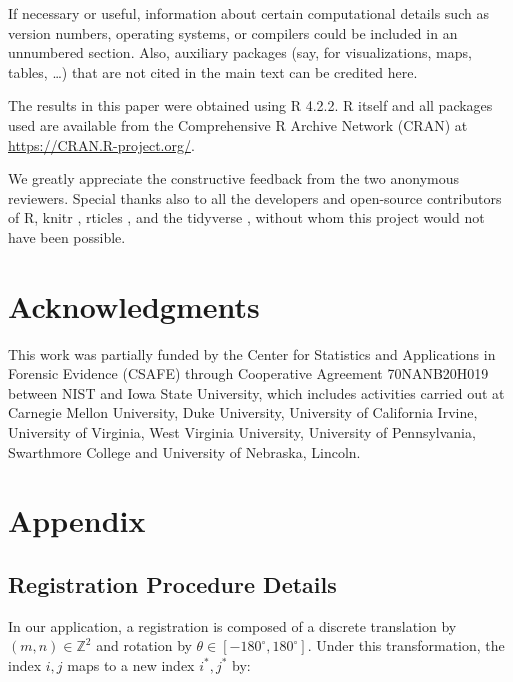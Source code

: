 \documentclass[11pt,]{isuthesis}
\begin{document}
If necessary or useful, information about certain computational details such as version numbers, operating systems, or compilers could be included in an unnumbered section.
Also, auxiliary packages (say, for visualizations, maps, tables, \dots) that are not cited in the main text can be credited here.

The results in this paper were obtained using R 4.2.2. \citep{Rlanguage}
R itself and all packages used are available from the Comprehensive R Archive Network (CRAN) at \url{https://CRAN.R-project.org/}.

We greatly appreciate the constructive feedback from the two anonymous reviewers.
Special thanks also to all the developers and open-source contributors of R, knitr \citep{knitr1, knitr2}, rticles \citep{rticles}, and the tidyverse \citep{tidyverse}, without whom this project would not have been possible.

\hypertarget{acknowledgments}{%
\chapter*{Acknowledgments}\label{acknowledgments}}

This work was partially funded by the Center for Statistics and Applications in Forensic Evidence (CSAFE) through Cooperative Agreement 70NANB20H019 between NIST and Iowa State University, which includes activities carried out at Carnegie Mellon University, Duke University, University of California Irvine, University of Virginia, West Virginia University, University of Pennsylvania, Swarthmore College and University of Nebraska, Lincoln.

\newpage

\setcounter{section}{0}
\renewcommand{\thesection}{\Alph{section}}

\hypertarget{appendix}{%
\chapter*{Appendix}\label{appendix}}

\hypertarget{registration-procedure-details}{%
\section{Registration Procedure Details}\label{registration-procedure-details}}

In our application, a registration is composed of a discrete translation by \((m,n) \in \mathbb{Z}^2\) and rotation by \(\theta \in [-180^\circ,180^\circ]\).
Under this transformation, the index \(i,j\) maps to a new index \(i^*,j^*\) by:
\end{document}
